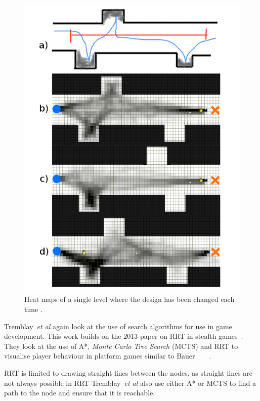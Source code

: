 \documentclass[journal]{IEEEtran}
\begin{document}
\begin{figure}[h]
	\includegraphics[width=1.0\linewidth]{TremblayHeatMap.png}
	\caption{ Heat maps of a single level where the design has been changed each time \cite{Tremblay2013}.}
	\label{TremblayHeatMap}
\end{figure} 

Tremblay~\textit{et al} again look at the use of search algorithms for use in game development. This work builds on the 2013 paper on RRT in stealth games~\cite{Tremblay2014}. They look at the use of A*, \textit{Monte Carlo Tree Search} (MCTS) and RRT to visualise player behaviour in platform games similar to Bauer ~\cite{Tremblay2014}  ~\cite{bauer2012} . 

RRT is limited to drawing straight lines between the nodes, as straight lines are not always possible in RRT  Tremblay~\textit{et al} also use either A* or MCTS to find a path to the node and ensure that it is reachable.
\end{document}
